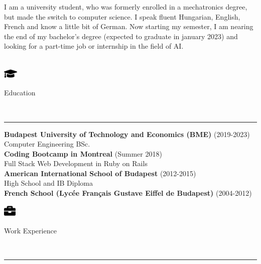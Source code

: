 \documentclass{article}
\begin{document}
I am a university student, who was formerly enrolled in a mechatronics degree, but made the switch to computer science. I speak fluent Hungarian, English, French and know a little bit of German. Now starting my  semester, I am nearing the end of my bachelor's degree (expected to graduate in january 2023) and looking for a part-time job or internship in the field of AI.  \\
\vspace{3mm} \\
\begin{minipage}[c]{7mm}
    \includegraphics[width=7mm]{../images/graduation-cap-solid.pdf}
\end{minipage}
\begin{minipage}[c]{100mm}
    {\large{Education}}
\end{minipage} \\
\hrule
\bigskip

\noindent
\textbf{Budapest University of Technology and Economics (BME)} \hspace{3mm} \color{gray} (2019-2023) \color{black} \\
Computer Engineering BSc.
\smallskip \\

\noindent
\textbf{Coding Bootcamp in Montreal} \hspace{3mm} \color{gray} (Summer 2018) \color{black} \\
Full Stack Web Development in Ruby on Rails
\smallskip \\

\noindent
\textbf{American International School of Budapest} \hspace{3mm} \color{gray} (2012-2015) \color{black} \\
High School and IB Diploma
\smallskip \\

\noindent
\textbf{French School (Lycée Français Gustave Eiffel de Budapest)} \hspace{3mm} \color{gray} (2004-2012) \color{black} \\
\vspace{4mm}

\noindent
\begin{minipage}[c]{7mm}
    \includegraphics[width=6mm]{../images/briefcase-solid.pdf}
\end{minipage}
\begin{minipage}[c]{100mm}
    {\large{Work Experience}}
\end{minipage} \\
\hrule
\bigskip
\end{document}

